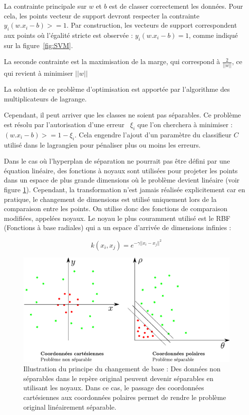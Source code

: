 La contrainte principale sur $w$ et $b$ est de classer correctement les données. Pour cela, les points vecteur de support devront respecter la contrainte $y_i ( w . x_i - b ) >= 1$. Par construction, les vecteurs de support correspondent aux points où l'égalité stricte est observée : $y_i ( w . x_i - b ) = 1$, comme indiqué sur la figure~\ref{fig:SVM}.

La seconde contrainte est la maximisation de la marge, qui correspond à  $\frac{2}{||w||}$, ce qui revient à minimiser $||w||$

La solution de ce problème d'optimisation est apportée par l'algorithme des multiplicateurs de lagrange. 

Cependant, il peut arriver que les classes ne soient pas séparables. Ce problème est résolu par l'autorisation d'une erreur~\cite{cortes1995support} $\xi_i$  que l'on cherchera à minimiser : $( w . x_i - b ) >= 1 - \xi_i $. Cela engendre l'ajout d'un paramètre du classifieur $C$ utilisé dans le lagrangien pour pénaliser plus ou moins les erreurs.

Dans le cas où l'hyperplan de séparation ne pourrait pas être défini par une équation linéaire, des fonctions à noyaux sont utilisées pour projeter les points dans un espace de plus grande dimensions où le problème devient linéaire (voir figure \ref{fig:kernelTrick}). Cependant, la transformation n'est jamais réalisée explicitement car en pratique, le changement de dimensions est utilisé uniquement lors de la comparaison entre les points. On utilise donc des fonctions de comparaison modifiées, appelées noyaux. Le noyau le plus couramment utilisé est le RBF (Fonctions à base radiales) qui a un espace d'arrivée de dimensions infinies :

\[ 
k(x_i,x_j)=e^{-\gamma||x_i-x_j||^2}  
\]

\begin{figure}[h]
	\begin{center}
	\includegraphics[width=15cm]{images/kernelTrick}
	\end{center}
	\caption[Changement de base pour les SVM]{Illustration du principe du changement de base : Des données non séparables dans le repère original peuvent devenir séparables en utilisant les noyaux. Dans ce cas, le passage des coordonnées cartésiennes aux coordonnées polaires permet de rendre le problème original linéairement séparable.}
	\label{fig:kernelTrick}
\end{figure}


